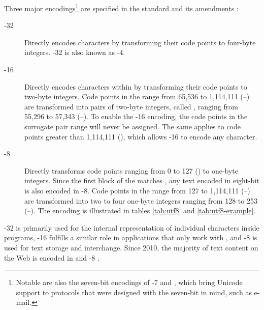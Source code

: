 Three major encodings\footnote{
  Notable are also the seven-bit encodings of -7
   and , which bring
  Unicode support to protocols that were designed with the seven-bit
   in mind, such as e-mail.}
are specified in the  standard and its amendments
\cite{iso93:am1,iso93:am2}:
\begin{description}
  \item[-32]Directly
    encodes  characters by transforming their code points to
    four-byte integers. -32 is also known as
    -4.
  \item[-16]
    Directly encodes characters within  by transforming their code
    points to two-byte integers. Code points in the range from 65,536 to
    1,114,111 (\mbox{--}) are transformed into pairs
    of two-byte integers, called , ranging from
    55,296 to 57,343 (\mbox{--}). To enable the
    -16 encoding, the code points in the surrogate pair range
    will never be assigned. The same applies to code points greater than
    1,114,111 (), which allows -16 to encode any
     character.
  \item[-8]
    Directly transforms code points ranging from 0 to 127 () to
    one-byte integers. Since the first  block of the
     matches , any text encoded in eight-bit
     is also encoded in -8. Code points in the
    range from 127 to 1,114,111 (\mbox{--}) are
    transformed into two to four one-byte integers ranging from 128 to 253
    (\mbox{--}). The encoding is illustrated in tables
    \ref{tab:utf8} and \ref{tab:utf8-example}.
\end{description}
-32 is primarily used for the internal representation of
individual  characters inside programs, -16 fulfills
a similar role in applications that only work with , and
-8 is used for text storage and interchange. Since 2010, the
majority of text content on the Web is encoded in  and
-8 \cite{qsuccess15}.

